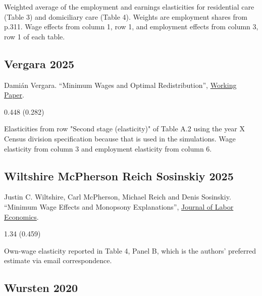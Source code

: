\vspace{0.7em}

 Weighted average of the employment and earnings elasticities for residential care (Table 3) and domiciliary care (Table 4). Weights are employment shares from p.311. Wage effects from column 1, row 1, and employment effects from column 3, row 1 of each table.

\subsection*{Vergara 2025}
\vspace{-0.7em}

\noindent Damián Vergara. ``Minimum Wages and Optimal Redistribution'', \href{https://dvergarad.github.io/files/JMP_DV.pdf}{Working Paper}.

\vspace{0.7em}

 0.448 (0.282)

\vspace{0.7em}

 Elasticities from row "Second stage (elasticity)" of Table A.2 using the year X Census division specification because that is used in the simulations. Wage elasticity from column 3 and employment elasticity from column 6.

\subsection*{Wiltshire McPherson Reich Sosinskiy 2025}
\vspace{-0.7em}

\noindent Justin C. Wiltshire, Carl McPherson, Michael Reich and Denis Sosinskiy. ``Minimum Wage Effects and Monopsony Explanations'', \href{https://doi.org/10.1086/735551}{Journal of Labor Economics}.

\vspace{0.7em}

 1.34 (0.459)

\vspace{0.7em}

 Own-wage elasticity reported in Table 4, Panel B, which is the authors' preferred estimate via email correspondence.

\subsection*{Wursten 2020}
\vspace{-0.7em}

